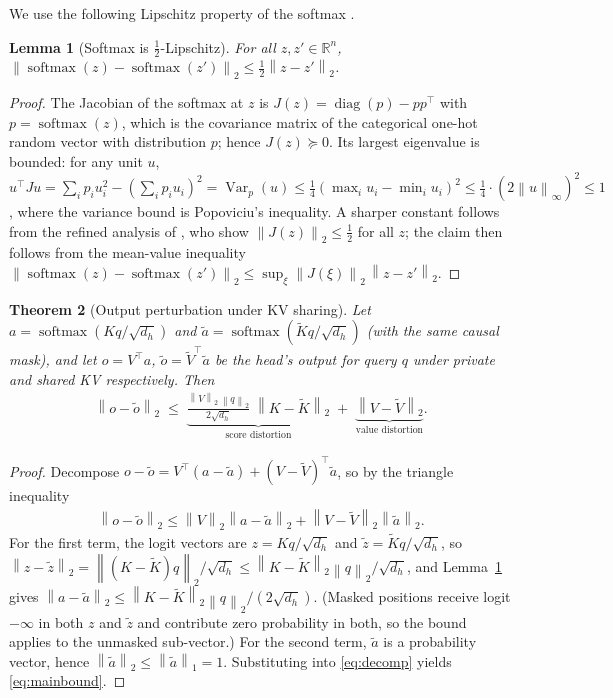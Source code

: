 \documentclass{article}
\newtheorem{theorem}{Theorem}[section]
\newtheorem{lemma}[theorem]{Lemma}
\newcommand{\R}{\mathbb{R}}
\newcommand{\softmax}{\operatorname{softmax}}
\newcommand{\norm}[1]{\left\lVert #1 \right\rVert}
\newcommand{\opnorm}[1]{\left\lVert #1 \right\rVert_{2}}
\begin{document}
We use the following Lipschitz property of the softmax
\citep{gao2017properties}.

\begin{lemma}[Softmax is $\tfrac12$-Lipschitz]
\label{lem:softmax}
For all $z, z' \in \R^n$,
$\norm{\softmax(z) - \softmax(z')}_2 \le \tfrac12 \norm{z - z'}_2$.
\end{lemma}

\begin{proof}
The Jacobian of the softmax at $z$ is
$J(z) = \operatorname{diag}(p) - p p^\top$ with $p = \softmax(z)$, which is
the covariance matrix of the categorical one-hot random vector with
distribution $p$; hence $J(z) \succeq 0$. Its largest eigenvalue is bounded:
for any unit $u$,
$u^\top J u = \sum_i p_i u_i^2 - (\sum_i p_i u_i)^2 = \operatorname{Var}_p(u)
\le \tfrac14 (\max_i u_i - \min_i u_i)^2 \le \tfrac14 \cdot (2\norm{u}_\infty)^2 \le 1$,
where the variance bound is Popoviciu's inequality. A sharper constant
follows from the refined analysis of \citet{gao2017properties}, who show
$\opnorm{J(z)} \le \tfrac12$ for all $z$; the claim then follows from the
mean-value inequality
$\norm{\softmax(z)-\softmax(z')}_2 \le \sup_{\xi}\opnorm{J(\xi)}\,\norm{z-z'}_2$.
\end{proof}

\begin{theorem}[Output perturbation under KV sharing]
\label{thm:perturbation}
Let $a = \softmax(K q / \sqrt{d_h})$ and
$\tilde a = \softmax(\tilde K q / \sqrt{d_h})$ (with the same causal mask),
and let $o = V^\top a$, $\tilde o = \tilde V^\top \tilde a$ be the head's
output for query $q$ under private and shared KV respectively. Then
\begin{align}
\norm{o - \tilde o}_2
\;\le\;
\underbrace{\frac{\opnorm{V}\, \norm{q}_2}{2 \sqrt{d_h}}\; \opnorm{K - \tilde K}}_{\text{score distortion}}
\;+\;
\underbrace{\opnorm{V - \tilde V}}_{\text{value distortion}}.
\label{eq:mainbound}
\end{align}
\end{theorem}

\begin{proof}
Decompose
$o - \tilde o = V^\top (a - \tilde a) + (V - \tilde V)^\top \tilde a$,
so by the triangle inequality
\begin{align}
\norm{o - \tilde o}_2
\le \opnorm{V} \norm{a - \tilde a}_2 + \opnorm{V - \tilde V} \norm{\tilde a}_2.
\label{eq:decomp}
\end{align}
For the first term, the logit vectors are $z = K q/\sqrt{d_h}$ and
$\tilde z = \tilde K q / \sqrt{d_h}$, so
$\norm{z - \tilde z}_2 = \norm{(K - \tilde K) q}_2 / \sqrt{d_h}
\le \opnorm{K - \tilde K} \norm{q}_2 / \sqrt{d_h}$,
and Lemma~\ref{lem:softmax} gives
$\norm{a - \tilde a}_2 \le \opnorm{K - \tilde K} \norm{q}_2 / (2\sqrt{d_h})$.
(Masked positions receive logit $-\infty$ in both $z$ and $\tilde z$ and
contribute zero probability in both, so the bound applies to the unmasked
sub-vector.) For the second term, $\tilde a$ is a probability vector, hence
$\norm{\tilde a}_2 \le \norm{\tilde a}_1 = 1$. Substituting into
\eqref{eq:decomp} yields \eqref{eq:mainbound}.
\end{proof}
\end{document}
